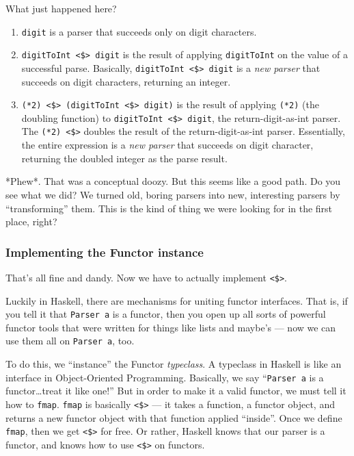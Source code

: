 \documentclass[]{article}
\begin{document}
What just happened here?

\begin{enumerate}
\def\labelenumi{\arabic{enumi}.}
\tightlist
\item
  \texttt{digit} is a parser that succeeds only on digit characters.
\item
  \texttt{digitToInt\ \textless{}\$\textgreater{}\ digit} is the result of
  applying \texttt{digitToInt} on the value of a successful parse. Basically,
  \texttt{digitToInt\ \textless{}\$\textgreater{}\ digit} is a \emph{new parser}
  that succeeds on digit characters, returning an integer.
\item
  \texttt{(*2)\ \textless{}\$\textgreater{}\ (digitToInt\ \textless{}\$\textgreater{}\ digit)}
  is the result of applying \texttt{(*2)} (the doubling function) to
  \texttt{digitToInt\ \textless{}\$\textgreater{}\ digit}, the
  return-digit-as-int parser. The \texttt{(*2)\ \textless{}\$\textgreater{}}
  doubles the result of the return-digit-as-int parser. Essentially, the entire
  expression is a \emph{new parser} that succeeds on digit character, returning
  the doubled integer as the parse result.
\end{enumerate}

*Phew*. That was a conceptual doozy. But this seems like a good path. Do you see
what we did? We turned old, boring parsers into new, interesting parsers by
``transforming'' them. This is the kind of thing we were looking for in the
first place, right?

\subsubsection{Implementing the Functor
instance}\label{implementing-the-functor-instance}

That's all fine and dandy. Now we have to actually implement
\texttt{\textless{}\$\textgreater{}}.

Luckily in Haskell, there are mechanisms for uniting functor interfaces. That
is, if you tell it that \texttt{Parser\ a} is a functor, then you open up all
sorts of powerful functor tools that were written for things like lists and
maybe's --- now we can use them all on \texttt{Parser\ a}, too.

To do this, we ``instance'' the Functor \emph{typeclass}. A typeclass in Haskell
is like an interface in Object-Oriented Programming. Basically, we say
``\texttt{Parser\ a} is a functor\ldots treat it like one!'' But in order to
make it a valid functor, we must tell it how to \texttt{fmap}. \texttt{fmap} is
basically \texttt{\textless{}\$\textgreater{}} --- it takes a function, a
functor object, and returns a new functor object with that function applied
``inside''. Once we define \texttt{fmap}, then we get
\texttt{\textless{}\$\textgreater{}} for free. Or rather, Haskell knows that our
parser is a functor, and knows how to use \texttt{\textless{}\$\textgreater{}}
on functors.
\end{document}
